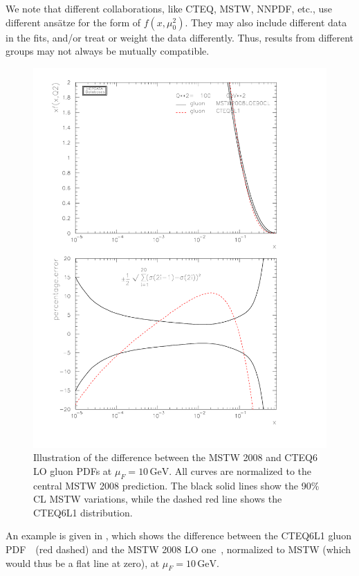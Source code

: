 %
We note that different collaborations, like CTEQ, MSTW, NNPDF, etc., use  different 
ans\"atze for the form of $f(x,\mu_0^2)$. They may also include
different data in the fits, and/or treat or weight the data
differently. Thus, results from different groups may not always be
mutually compatible. 
\begin{figure}[t]
\centering
\includegraphics*[scale=0.45]{pdfunc.pdf}
\caption{Illustration of the difference between the MSTW 2008 and CTEQ6 LO
 gluon PDFs at $\mu_F = 10\,\mathrm{GeV}$. 
All curves are normalized to the central MSTW 2008
 prediction. The black solid lines show the 90\% CL MSTW variations,
 while the dashed red line shows the CTEQ6L1 distribution.\label{fig:pdfUnc}}
\end{figure}
An example is given in , which shows the difference
 between the CTEQ6L1 gluon PDF~\cite{Pumplin:2002vw}~(red dashed) and
 the MSTW 2008 LO 
 one~\cite{Martin:2009iq}, normalized to MSTW  (which would thus
 be a flat line at zero),  at $\mu_F=10\,\mathrm{GeV}$. 
